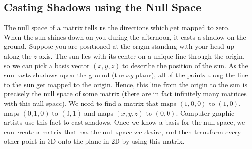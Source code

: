 \subsection{Casting Shadows using the Null Space}

The null space of a matrix tells us the directions which get mapped to zero.  When the sun shines down on you during the afternoon, it casts a shadow on the ground.  Suppose you are positioned at the origin standing with your head up along the $z$ axis.  The sun lies with its center on a unique line through the origin, so we can pick a basis vector $(x,y,z)$ to describe the position of the sun.  As the sun casts shadows upon the ground (the $xy$ plane), all of the points along the line to the sun get mapped to the origin.  Hence, this line from the origin to the sun is precisely the null space of some matrix (there are in fact infinitely many matrices with this null space). We need to find a matrix that maps $(1,0,0)$ to $(1,0)$, maps $(0,1,0)$ to $(0,1)$ and maps $(x,y,z)$ to $(0,0)$. Computer graphic artists use this fact to cast shadows. Once we know a basis for the null space, we can create a matrix that has the null space we desire, and then transform every other point in 3D onto the plane in 2D by using this matrix.


